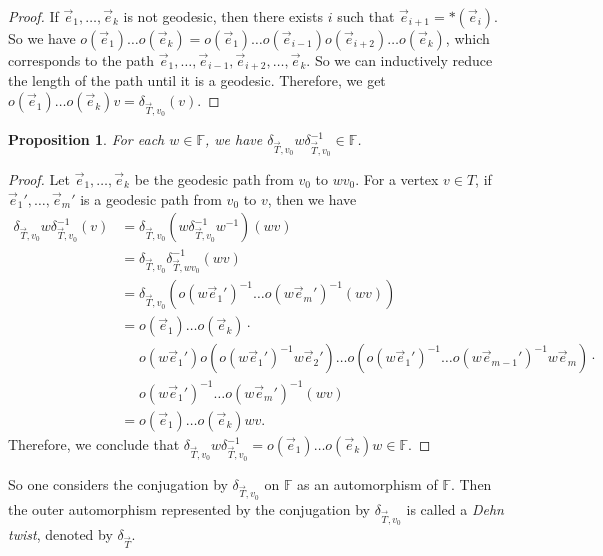 \documentclass[12pt,a4paper]{amsart}
\numberwithin{equation}{section}
\newcommand{\FF}{\mathbb{F}}
\theoremstyle{plain}
\newtheorem{proposition}[theorem]{Proposition}
\theoremstyle{definition}
\theoremstyle{remark}
\begin{document}
\begin{proof}
    If $\vec{e}_1, \dots, \vec{e}_k$ is not geodesic, then there exists $i$ such that $\vec{e}_{i+1} = *(\vec{e}_i)$.
    So we have $o(\vec{e}_1) \dots o(\vec{e}_k) = o(\vec{e}_1) \dots o(\vec{e}_{i-1}) o(\vec{e}_{i+2}) \dots o(\vec{e}_k)$, which corresponds to the path $\vec{e}_1, \dots, \vec{e}_{i-1}, \vec{e}_{i+2}, \dots, \vec{e}_k$.
    So we can inductively reduce the length of the path until it is a geodesic.
    Therefore, we get $o(\vec{e}_1) \dots o(\vec{e}_k)v = \delta_{\vec{T}, v_0}(v)$.
\end{proof}

\begin{proposition}
    For each $w \in \FF$, we have $\delta_{\vec{T}, v_0} w \delta_{\vec{T}, v_0}^{-1} \in \FF$.
\end{proposition}

\begin{proof}
    Let $\vec{e}_1, \dots, \vec{e}_k$ be the geodesic path from $v_0$ to $wv_0$.
    For a vertex $v \in T$, if $\vec{e}_1', \dots, \vec{e}_m'$ is a geodesic path from $v_0$ to $v$, then we have
    \begin{align*}
        \delta_{\vec{T}, v_0} w \delta_{\vec{T}, v_0}^{-1} (v) &= \delta_{\vec{T}, v_0} (w\delta_{\vec{T}, v_0}^{-1}w^{-1})(wv) \\
        &= \delta_{\vec{T},v_0} \delta_{\vec{T},wv_0}^{-1}(wv) \\
        &=\delta_{\vec{T}, v_0}(o(w\vec{e}_1')^{-1} \dots o(w \vec{e}_m')^{-1}(wv)) \\
        &= o(\vec{e}_1) \dots o(\vec{e}_k) \cdot \\ &\quad\,\, o(w\vec{e}_1') o(o(w\vec{e}_1')^{-1}w\vec{e}_2') \dots o(o(w\vec{e}_1')^{-1} \dots o(w\vec{e}_{m-1}')^{-1}w\vec{e}_m) \cdot \\ &\quad\,\, o(w\vec{e}_1')^{-1} \dots o(w \vec{e}_m')^{-1}(wv) \\
        &= o(\vec{e}_1) \dots o(\vec{e}_k)wv.
    \end{align*}
    Therefore, we conclude that $\delta_{\vec{T}, v_0} w \delta_{\vec{T}, v_0}^{-1} = o(\vec{e}_1) \dots o(\vec{e}_k)w \in \FF$.
\end{proof}

So one considers the conjugation by $\delta_{\vec{T}, v_0}$ on $\FF$ as an automorphism of $\FF$.
Then the outer automorphism represented by the conjugation by $\delta_{\vec{T}, v_0}$ is called a \emph{Dehn twist}, denoted by $\delta_{\vec{T}}$.
\end{document}
